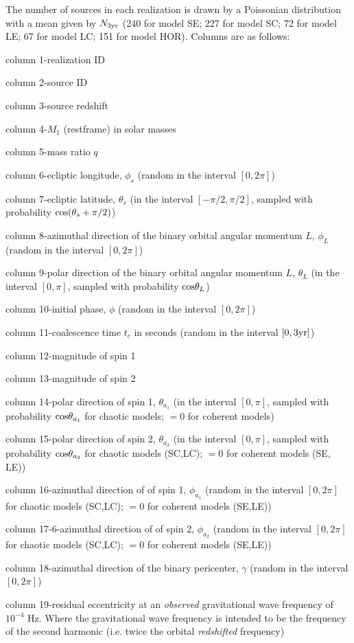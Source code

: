 \documentclass{iopart}
\newenvironment{itemize_estret}{
\begin{itemize}
  \setlength{\itemsep}{1pt}
  \setlength{\parskip}{0pt}
  \setlength{\parsep}{0pt}
}{\end{itemize}}
\begin{document}
The number of sources in each realization is drawn by
a Poissonian distribution with a mean given by  $N_{3{\rm yr}}$
(240 for model SE; 227 for model SC; 72 for model LE; 67 for model LC; 
151 for model HOR).
Columns are as follows:
\begin{itemize_estret}
\item column 1-realization ID
\item column 2-source ID
\item column 3-source redshift  
\item column 4-$M_1$ (restframe) in solar masses  
\item column 5-mass ratio $q$  
\item column 6-ecliptic longitude, $\phi_s$ (random in the interval $[0,2\pi]$)  
\item column 7-ecliptic latitude, $\theta_s$ (in the interval $[-\pi/2,\pi/2]$, sampled with probability ${\rm cos}(\theta_s+\pi/2)$)  
\item column 8-azimuthal direction of the binary orbital angular momentum $L$, $\phi_L$ (random in the interval $[0,2\pi]$)   
\item column 9-polar direction of the binary orbital angular momentum $L$, $\theta_L$ (in the interval $[0,\pi]$, sampled with probability ${\rm cos}{\theta_L}$)  
\item column 10-initial phase, $\phi$ (random in the interval $[0,2\pi]$)  
\item column 11-coalescence time $t_c$ in seconds (random in the interval $[0,3 {\rm yr}]$)  
\item column 12-magnitude of spin 1  
\item column 13-magnitude of spin 2  
\item column 14-polar direction of spin 1, $\theta_{a_{1}}$ (in the interval $[0,\pi]$, sampled with probability ${\rm cos}{\theta_{a_{1}}}$ for chaotic models; $=0$ for coherent models)  
\item column 15-polar direction of spin 2, $\theta_{a_{2}}$ (in the interval $[0,\pi]$, sampled with probability ${\rm cos}{\theta_{a_{2}}}$ for chaotic models (SC,LC); $=0$ for coherent models (SE, LE))    
\item column 16-azimuthal direction of of spin 1, $\phi_{a_{1}}$ (random in the interval $[0,2\pi]$ for chaotic models (SC,LC); $=0$ for coherent models (SE,LE))      
\item column 17-6-azimuthal direction of of spin 2, $\phi_{a_{2}}$ (random in the interval $[0,2\pi]$ for chaotic models (SC,LC); $=0$ for coherent models (SE,LE)) 
\item column 18-azimuthal direction of the binary pericenter, $\gamma$ (random in the interval $[0,2\pi]$) 
\item column 19-residual eccentricity at an {\it observed} gravitational wave frequency of $10^{-4}$ Hz. Where the gravitational wave frequency is intended to be the frequency of the second harmonic (i.e. twice the orbital {\it redshifted} frequency) 
\end{itemize_estret}
\end{document}
